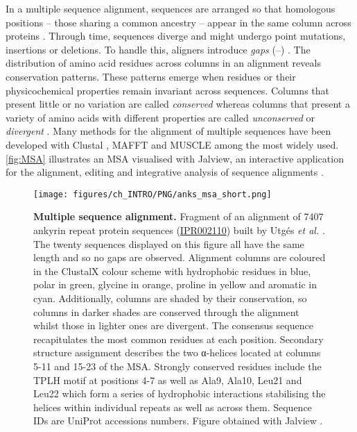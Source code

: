 In a multiple sequence alignment, sequences are arranged so that homologous positions -- those sharing a common ancestry -- appear in the same column across proteins \cite{NEEDLEMAN_1970_MSA}. Through time, sequences diverge and might undergo point mutations, insertions or deletions. To handle this, aligners introduce \textit{gaps} (--) \cite{SMITH_1981_MSA}. The distribution of amino acid residues across columns in an alignment reveals conservation patterns. These patterns emerge when residues or their physicochemical properties remain invariant across sequences. Columns that present little or no variation are called \textit{conserved} whereas columns that present a variety of amino acids with different properties are called \textit{unconserved} or \textit{divergent} \cite{LIVINGSTONE_1993_CONS}. Many methods for the alignment of multiple sequences have been developed with Clustal \cite{HIGGINS_1988_CLUSTAL, HIGGINS_1992_CLUSTALV, THOMPSON_1994_CLUSTALW, JEANMOUGIN_1998_CLUSTALX, SIEVERS_2011_CLUSTALO}, MAFFT \cite{KATOH_2002_MAFFT, KATOH_2008_MAFFT, KATOH_2013_MAFFT} and MUSCLE \cite{EDGAR_2004_MUSCLE, EDGAR_2022_MUSCLE5} among the most widely used. \autoref{fig:MSA} illustrates an MSA visualised with Jalview, an interactive application for the alignment, editing and integrative analysis of sequence alignments \cite{WATERHOUSE_2009_JALVIEW}.

\begin{figure}[htb!]
    \centering
    \texttt{[image: figures/ch\_INTRO/PNG/anks\_msa\_short.png]}
    \caption[Multiple sequence alignment]{\textbf{Multiple sequence alignment.} Fragment of an alignment of 7407 ankyrin repeat protein sequences (\href{https://www.ebi.ac.uk/interpro/entry/InterPro/IPR002110/}{IPR002110}) built by Utgés \textit{et al.} \cite{UTGES_2021_ANKS}. The twenty sequences displayed on this figure all have the same length and so no gaps are observed. Alignment columns are coloured in the ClustalX colour scheme \cite{JEANMOUGIN_1998_CLUSTALX} with hydrophobic residues in blue, polar in green, glycine in orange, proline in yellow and aromatic in cyan. Additionally, columns are shaded by their conservation, so columns in darker shades are conserved through the alignment whilst those in lighter ones are divergent. The consensus sequence recapitulates the most common residues at each position. Secondary structure assignment describes the two α-helices located at columns 5-11 and 15-23 of the MSA. Strongly conserved residues include the TPLH motif at positions 4-7 as well as Ala9, Ala10, Leu21 and Leu22 which form a series of hydrophobic interactions stabilising the helices within individual repeats as well as across them. Sequence IDs are UniProt accessions numbers. Figure obtained with Jalview \cite{WATERHOUSE_2009_JALVIEW}.}
    \label{fig:MSA}
\end{figure}

